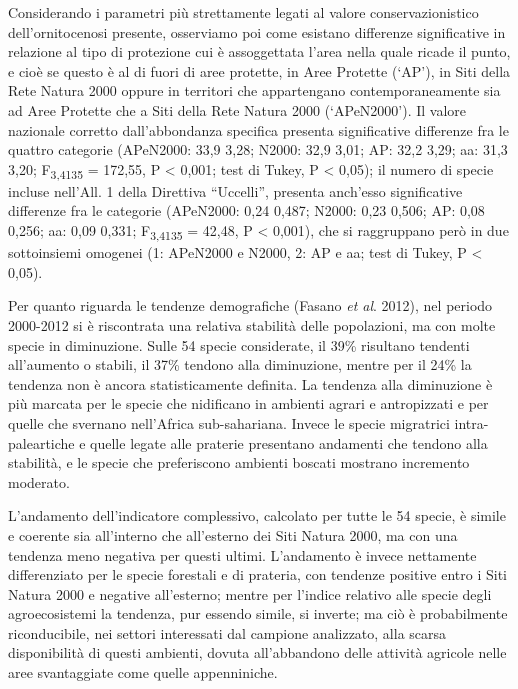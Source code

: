 Considerando i parametri pi\`u strettamente legati al valore
conservazionistico dell{\textquoteright}ornitocenosi presente,
osserviamo poi come esistano differenze significative in relazione al
tipo di protezione cui \`e assoggettata l{\textquoteright}area nella
quale ricade il punto, e cio\`e se questo \`e al di fuori di aree
protette, in Aree Protette ({\textquoteleft}AP{\textquoteright}), in
Siti della Rete Natura 2000 oppure in territori che appartengano
contemporaneamente sia ad Aree Protette che a Siti della Rete Natura
2000 ({\textquoteleft}APeN2000{\textquoteright}). Il valore nazionale
corretto dall{\textquoteright}abbondanza specifica presenta
significative differenze fra le quattro categorie (APeN2000: 33,9
{\textpm} 3,28; N2000: 32,9 {\textpm} 3,01; AP: 32,2 {\textpm} 3,29;
aa: 31,3 {\textpm} 3,20; F\textsubscript{3,4135} = 172,55, P
{\textless} 0,001; test di Tukey, P {\textless} 0,05); il numero di
specie incluse nell{\textquoteright}All. 1 della Direttiva
{\textquotedblleft}Uccelli{\textquotedblright}, presenta
anch{\textquoteright}esso significative differenze fra le categorie
(APeN2000: 0,24 {\textpm} 0,487; N2000: 0,23 {\textpm} 0,506; AP: 0,08
{\textpm} 0,256; aa: 0,09 {\textpm} 0,331; F\textsubscript{3,4135} =
42,48, P {\textless} 0,001), che si raggruppano per\`o in due
sottoinsiemi omogenei (1: APeN2000 e N2000, 2: AP e aa; test di Tukey,
P {\textless} 0,05).  

Per quanto riguarda le tendenze demografiche (Fasano \textit{et al}.
2012), nel periodo 2000-2012 si \`e riscontrata una relativa
stabilit\`a delle popolazioni, ma con molte specie in diminuzione.
Sulle 54 specie considerate, il 39\% risultano tendenti
all{\textquoteright}aumento o stabili, il 37\% tendono alla
diminuzione, mentre per il 24\% la tendenza non \`e ancora
statisticamente definita. La tendenza alla diminuzione \`e pi\`u
marcata per le specie che nidificano in ambienti agrari e antropizzati
e per quelle che svernano nell{\textquoteright}Africa sub-sahariana.
Invece le specie migratrici intra-paleartiche e quelle legate alle
praterie presentano andamenti che tendono alla stabilit\`a, e le specie
che preferiscono ambienti boscati mostrano incremento moderato. 

L{\textquoteright}andamento dell{\textquoteright}indicatore complessivo,
calcolato per tutte le 54 specie, \`e simile e coerente sia
all{\textquoteright}interno che all{\textquoteright}esterno dei Siti
Natura 2000, ma con una tendenza meno negativa per questi ultimi.
L{\textquoteright}andamento \`e invece nettamente differenziato per le
specie forestali e di prateria, con tendenze positive entro i Siti
Natura 2000 e negative all{\textquoteright}esterno; mentre per
l{\textquoteright}indice relativo alle specie degli agroecosistemi la
tendenza, pur essendo simile, si inverte; ma ci\`o \`e probabilmente
riconducibile, nei settori  interessati dal campione analizzato, alla
scarsa disponibilit\`a di questi ambienti, dovuta
all{\textquoteright}abbandono delle attivit\`a agricole nelle aree
svantaggiate come quelle appenniniche.

